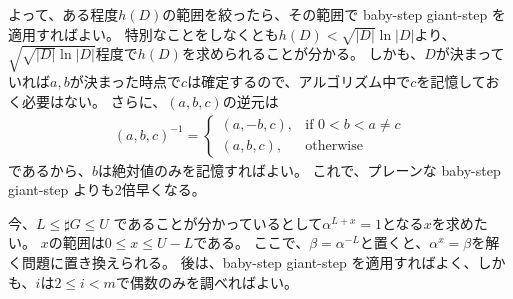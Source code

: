 よって、ある程度$h(D)$の範囲を絞ったら、その範囲で baby-step giant-step を適用すればよい。
特別なことをしなくとも$h(D) < \sqrt{|D|}\ln{|D|}$より、$\sqrt{\sqrt{|D|}\ln{|D|}}$程度で$h(D)$を求められることが分かる。
しかも、$D$が決まっていれば$a,b$が決まった時点で$c$は確定するので、アルゴリズム中で$c$を記憶しておく必要はない。
さらに、$(a,b,c)$の逆元は
\begin{align*}
(a,b,c)^{-1} =
\begin{cases}
(a, -b, c), &\mbox{if } 0 < b < a \neq c\\
(a, b, c), &\mbox{otherwise}
\end{cases}
\end{align*}
であるから、$b$は絶対値のみを記憶すればよい。
これで、プレーンな baby-step giant-step よりも2倍早くなる。

今、$L\le\sharp G\le U$ であることが分かっているとして$\alpha^{L+x}=1$となる$x$を求めたい。
$x$の範囲は$0\le x \le U-L$である。
ここで、$\beta=\alpha^{-L}$と置くと、$\alpha^x=\beta$を解く問題に置き換えられる。
後は、baby-step giant-step を適用すればよく、しかも、$i$は$2\le i <m$で偶数のみを調べればよい。

